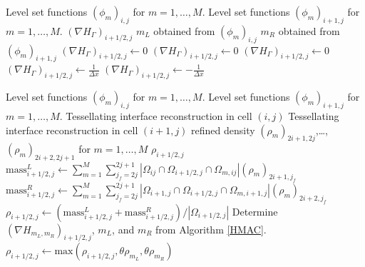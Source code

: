 \documentclass[]{article}
\begin{document}
\begin{algorithm}
\caption{Algorithm for determining $(\nabla H_{\Gamma})_{i+1/2,j}$ at cell face $(i+1/2,j)$ \label{HMAC} }
\begin{algorithmic}[1] %
\Require Level set functions $(\phi_{m})_{i,j}$ for $m=1,\ldots,M$.
\Require Level set functions $(\phi_{m})_{i+1,j}$ for $m=1,\ldots,M$.
\Ensure $(\nabla H_{\Gamma})_{i+1/2,j}$
\State $m_{L}$ obtained from $(\phi_{m})_{i,j}$ 
\State $m_{R}$ obtained from $(\phi_{m})_{i+1,j}$ 
\State $(\nabla H_{\Gamma})_{i+1/2,j}\gets 0$
\State $(\nabla H_{\Gamma})_{i+1/2,j}\gets 0$
\State $(\nabla H_{\Gamma})_{i+1/2,j}\gets 0$
\State $(\nabla H_{\Gamma})_{i+1/2,j}\gets\frac{1}{\Delta x}$
\Else
\State $(\nabla H_{\Gamma})_{i+1/2,j}\gets -\frac{1}{\Delta x}$
\EndIf
\end{algorithmic}
\end{algorithm}

\begin{algorithm}
\caption{Algorithm for determining the face centered density, $\rho_{i+1/2,j}$ at cell face $(i+1/2,j)$ \label{rhoMAC} }
\begin{algorithmic}[1] %
\Require Level set functions $(\phi_{m})_{i,j}$ for $m=1,\ldots,M$.  
\Require Level set functions $(\phi_{m})_{i+1,j}$ for $m=1,\ldots,M$.  
\Require Tessellating interface reconstruction in cell $(i,j)$ 
\Require Tessellating interface reconstruction in cell $(i+1,j)$ 
\Require refined density $(\rho_{m})_{2i+1,2j}$,\ldots,$(\rho_{m})_{2i+2,2j+1}$ for $m=1,\ldots,M$ 
\Ensure $\rho_{i+1/2,j}$
\State $\mbox{mass}_{i+1/2,j}^{L}\gets\sum_{m=1}^{M}\sum_{j_{f}=2j}^{2j+1} |\Omega_{ij}\cap\Omega_{i+1/2,j}\cap\Omega_{m,ij}|(\rho_{m})_{2i+1,j_{f}}$
\State $\mbox{mass}_{i+1/2,j}^{R}\gets\sum_{m=1}^{M}\sum_{j_{f}=2j}^{2j+1} |\Omega_{i+1,j}\cap\Omega_{i+1/2,j}\cap\Omega_{m,i+1,j}|(\rho_{m})_{2i+2,j_{f}}$
\State $\rho_{i+1/2,j}\gets(\mbox{mass}_{i+1/2,j}^{L}+\mbox{mass}_{i+1/2,j}^{R})/|\Omega_{i+1/2,j}|$
\State Determine $(\nabla H_{m_{L},m_{R}})_{i+1/2,j}$, $m_{L}$, and $m_{R}$ from Algorithm \ref{HMAC}.
 \State $\rho_{i+1/2,j}\gets\mbox{max}(\rho_{i+1/2,j},\theta\rho_{m_{L}},\theta\rho_{m_{R}})$
\EndIf
\end{algorithmic}
\end{algorithm}
\end{document}
